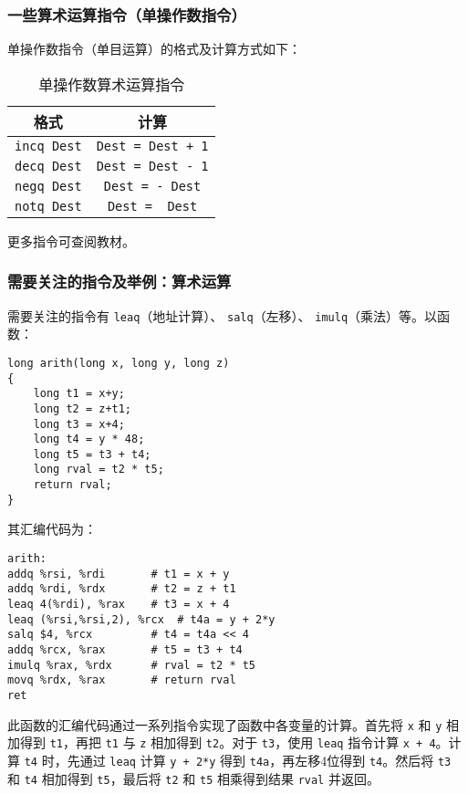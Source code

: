 \subsubsection{一些算术运算指令（单操作数指令）}
单操作数指令（单目运算）的格式及计算方式如下：
\begin{table}[H]
    \captionsetup{skip=4pt}
    \centering
    \setlength{\arrayrulewidth}{1pt}
    \begin{tabular}{cc}
        \hline
        格式                          & 计算                                \\
        \hline
        \texttt{incq Dest} & \texttt{Dest = Dest + 1} \\
        \texttt{decq Dest} & \texttt{Dest = Dest - 1} \\
        \texttt{negq Dest} & \texttt{Dest = - Dest}   \\
        \texttt{notq Dest} & \texttt{Dest = ~Dest}    \\
        \hline
    \end{tabular}
    \caption{单操作数算术运算指令}
\end{table}
更多指令可查阅教材。
\subsubsection{需要关注的指令及举例：算术运算}
需要关注的指令有 \texttt{leaq}（地址计算）、 \texttt{salq}（左移）、 \texttt{imulq}（乘法）等。以函数：
\begin{verbatim}
long arith(long x, long y, long z)
{
    long t1 = x+y;
    long t2 = z+t1;
    long t3 = x+4;
    long t4 = y * 48;
    long t5 = t3 + t4;
    long rval = t2 * t5;
    return rval;
}
\end{verbatim}
其汇编代码为：
\begin{verbatim}
arith:
addq %rsi, %rdi       # t1 = x + y
addq %rdi, %rdx       # t2 = z + t1
leaq 4(%rdi), %rax    # t3 = x + 4
leaq (%rsi,%rsi,2), %rcx  # t4a = y + 2*y
salq $4, %rcx         # t4 = t4a << 4
addq %rcx, %rax       # t5 = t3 + t4
imulq %rax, %rdx      # rval = t2 * t5
movq %rdx, %rax       # return rval
ret
\end{verbatim}
此函数的汇编代码通过一系列指令实现了函数中各变量的计算。首先将 \texttt{x} 和 \texttt{y} 相加得到 \texttt{t1}，再把 \texttt{t1} 与 \texttt{z} 相加得到 \texttt{t2}。对于 \texttt{t3}，使用 \texttt{leaq} 指令计算 \texttt{x + 4}。计算 \texttt{t4} 时，先通过 \texttt{leaq} 计算 \texttt{y + 2*y} 得到 \texttt{t4a}，再左移4位得到 \texttt{t4}。然后将 \texttt{t3} 和 \texttt{t4} 相加得到 \texttt{t5}，最后将 \texttt{t2} 和 \texttt{t5} 相乘得到结果 \texttt{rval} 并返回。

